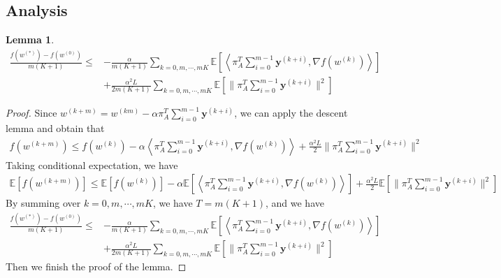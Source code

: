 \documentclass{article}
\newtheorem{lemma}[thm]{Lemma}
\newcommand{\vy}{{\mathbf{y}}}
\newcommand{\EE}[1]{\mathbb{E}\left[#1\right]}
\newcommand{\norm}[1]{\| #1 \|}
\newcommand{\ip}[1]{\left\langle#1\right\rangle}
\begin{document}
\subsection{Analysis}
\begin{lemma}\label{Convergence Analysis and Linear Speedup-Analysis}
\begin{align*}
  \frac{f(w^{(*)})-f(w^{(0)})}{m(K+1)}\leq& -\frac{\alpha}{m(K+1)}\sum_{k=0,m,\cdots,mK} \EE{\ip{\pi_{A}^T\sum_{i=0}^{m-1}\vy^{(k+i)},\nabla f(w^{(k)})}}\\&+\frac{\alpha^2L}{2m(K+1)}\sum_{k=0,m,\cdots,mK}\EE{\norm{\pi_{A}^T\sum_{i=0}^{m-1}\vy^{(k+i)}}^2}
\end{align*}
\end{lemma}
\begin{proof}
Since $w^{(k+m)}=w^{(km)}-\alpha\pi_{A}^T\sum_{i=0}^{m-1}\vy^{(k+i)}$, we can apply the descent lemma and obtain that
\begin{align*}
  f(w^{(k+m)})\leq f(w^{(k)})-\alpha \ip{\pi_{A}^T\sum_{i=0}^{m-1}\vy^{(k+i)},\nabla f(w^{(k)})}+\frac{\alpha^2L}{2}\norm{\pi_{A}^T\sum_{i=0}^{m-1}\vy^{(k+i)}}^2
\end{align*}
Taking conditional expectation, we have
\begin{align*}
  \EE{f(w^{(k+m)})}\leq \EE{f(w^{(k)})}-\alpha \EE{\ip{\pi_{A}^T\sum_{i=0}^{m-1}\vy^{(k+i)},\nabla f(w^{(k)})}}+\frac{\alpha^2L}{2}\EE{\norm{\pi_{A}^T\sum_{i=0}^{m-1}\vy^{(k+i)}}^2}
\end{align*}
By summing over $k=0,m,\cdots,mK$, we have $T=m(K+1)$, and we have
\begin{align*}
  \frac{f(w^{(*)})-f(w^{(0)})}{m(K+1)}\leq& -\frac{\alpha}{m(K+1)}\sum_{k=0,m,\cdots,mK} \EE{\ip{\pi_{A}^T\sum_{i=0}^{m-1}\vy^{(k+i)},\nabla f(w^{(k)})}}\\&+\frac{\alpha^2L}{2m(K+1)}\sum_{k=0,m,\cdots,mK}\EE{\norm{\pi_{A}^T\sum_{i=0}^{m-1}\vy^{(k+i)}}^2}
\end{align*}
Then we finish the proof of the lemma.
\end{proof}
\end{document}
